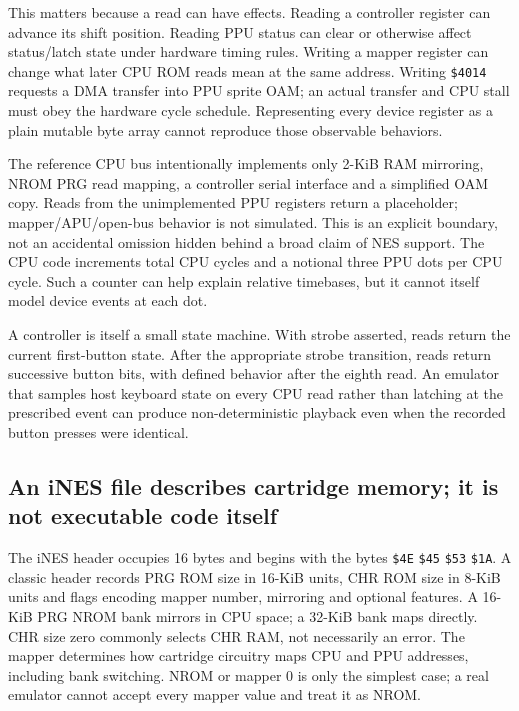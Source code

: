 This matters because a read can have effects. Reading a controller register can advance its shift position. Reading PPU status can clear or otherwise affect status/latch state under hardware timing rules. Writing a mapper register can change what later CPU ROM reads mean at the same address. Writing \texttt{\$4014} requests a DMA transfer into PPU sprite OAM; an actual transfer and CPU stall must obey the hardware cycle schedule. Representing every device register as a plain mutable byte array cannot reproduce those observable behaviors.

The reference CPU bus intentionally implements only 2-KiB RAM mirroring, NROM PRG read mapping, a controller serial interface and a simplified OAM copy. Reads from the unimplemented PPU registers return a placeholder; mapper/APU/open-bus behavior is not simulated. This is an explicit boundary, not an accidental omission hidden behind a broad claim of NES support. The CPU code increments total CPU cycles and a notional three PPU dots per CPU cycle. Such a counter can help explain relative timebases, but it cannot itself model device events at each dot.

A controller is itself a small state machine. With strobe asserted, reads return the current first-button state. After the appropriate strobe transition, reads return successive button bits, with defined behavior after the eighth read. An emulator that samples host keyboard state on every CPU read rather than latching at the prescribed event can produce non-deterministic playback even when the recorded button presses were identical.

\subsection{An iNES file describes cartridge memory; it is not executable code itself}\label{06-engine-ii-ch042-an-ines-file-describes-cartridge-memory-it-is-not-executable-code-itself}

The iNES header occupies 16 bytes and begins with the bytes \texttt{\$4E} \texttt{\$45} \texttt{\$53} \texttt{\$1A}. A classic header records PRG ROM size in 16-KiB units, CHR ROM size in 8-KiB units and flags encoding mapper number, mirroring and optional features. A 16-KiB PRG NROM bank mirrors in CPU space; a 32-KiB bank maps directly. CHR size zero commonly selects CHR RAM, not necessarily an error. The mapper determines how cartridge circuitry maps CPU and PPU addresses, including bank switching. NROM or mapper 0 is only the simplest case; a real emulator cannot accept every mapper value and treat it as NROM.

